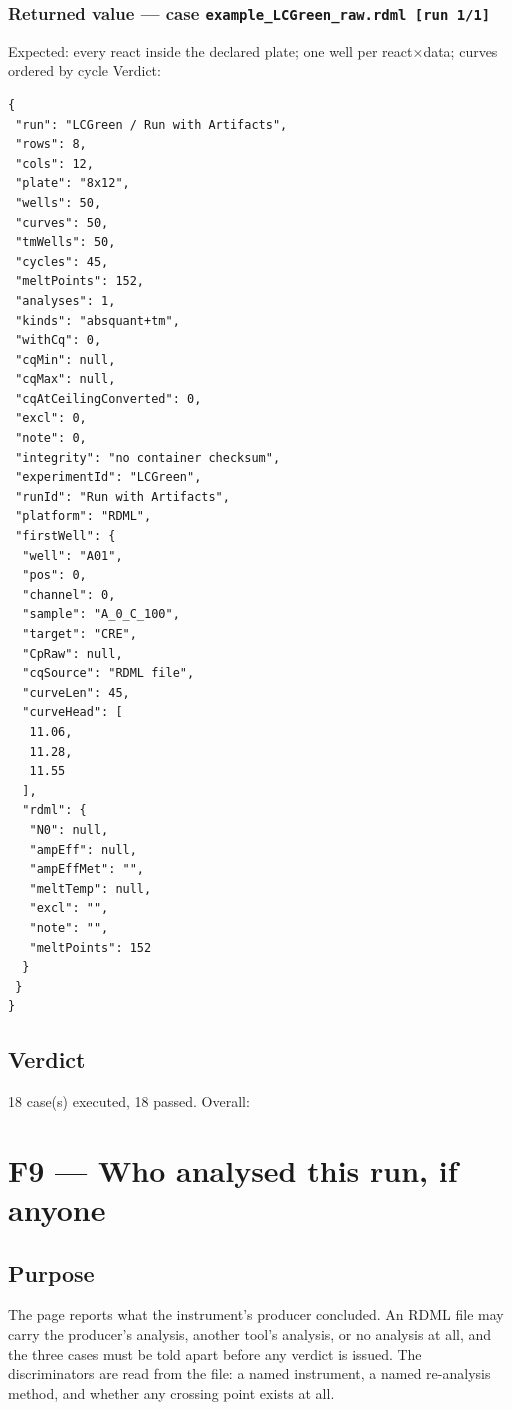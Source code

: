 \subsubsection*{Returned value --- case \texttt{example\_\allowbreak{}LCGreen\_\allowbreak{}raw.\allowbreak{}rdml \allowbreak{}[\allowbreak{}run \allowbreak{}1/\allowbreak{}1]\allowbreak{}}}
Expected: every react inside the declared plate; one well per react×data; curves ordered by cycle \hfill Verdict: \PASS
\begin{lstlisting}[style=jstiny]
{
 "run": "LCGreen / Run with Artifacts",
 "rows": 8,
 "cols": 12,
 "plate": "8x12",
 "wells": 50,
 "curves": 50,
 "tmWells": 50,
 "cycles": 45,
 "meltPoints": 152,
 "analyses": 1,
 "kinds": "absquant+tm",
 "withCq": 0,
 "cqMin": null,
 "cqMax": null,
 "cqAtCeilingConverted": 0,
 "excl": 0,
 "note": 0,
 "integrity": "no container checksum",
 "experimentId": "LCGreen",
 "runId": "Run with Artifacts",
 "platform": "RDML",
 "firstWell": {
  "well": "A01",
  "pos": 0,
  "channel": 0,
  "sample": "A_0_C_100",
  "target": "CRE",
  "CpRaw": null,
  "cqSource": "RDML file",
  "curveLen": 45,
  "curveHead": [
   11.06,
   11.28,
   11.55
  ],
  "rdml": {
   "N0": null,
   "ampEff": null,
   "ampEffMet": "",
   "meltTemp": null,
   "excl": "",
   "note": "",
   "meltPoints": 152
  }
 }
}
\end{lstlisting}

\subsection*{Verdict}
18 case(s) executed, 18 passed. Overall: \PASS
\clearpage
\section{F9\quad{} --- Who analysed this run, if anyone}
\label{sec:runProcessingState}
\subsection*{Purpose}
The page reports what the instrument's producer concluded. An RDML file may carry the
producer's analysis, another tool's analysis, or no analysis at all, and the three cases must be
told apart before any verdict is issued. The discriminators are read from the file: a named
instrument, a named re-analysis method, and whether any crossing point exists at all.
